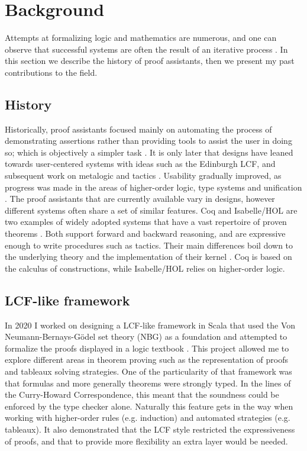 \section{Background}
\label{sec:background}

Attempts at formalizing logic and mathematics are numerous, and one can observe that successful systems are often the result of an iterative process \cite{Paulson2019, Harrison2014}. In this section we describe the history of proof assistants, then we present my past contributions to the field.

\subsection{History}

Historically, proof assistants focused mainly on automating the process of demonstrating assertions rather than providing tools to assist the user in doing so; which is objectively a simpler task \cite{Harrison2014}. It is only later that designs have leaned towards user-centered systems with ideas such as the Edinburgh LCF, and subsequent work on metalogic and tactics \cite{Milner1984}. Usability gradually improved, as progress was made in the areas of higher-order logic, type systems and unification \cite{Paulson2019}. The proof assistants that are currently available vary in designs, however different systems often share a set of similar features. Coq and Isabelle/HOL are two examples of widely adopted systems that have a vast repertoire of proven theorems \cite{Yushkovskiy2018}. Both support forward and backward reasoning, and are expressive enough to write procedures such as tactics. Their main differences boil down to the underlying theory and the implementation of their kernel \cite{Barras1999, Wenzel2021}. Coq is based on the calculus of constructions, while Isabelle/HOL relies on higher-order logic.

\subsection{LCF-like framework}

In 2020 I worked on designing a LCF-like framework in Scala that used the Von Neumann-Bernays-Gödel set theory (NBG) as a foundation \cite{Cassayre2020} and attempted to formalize the proofs displayed in a logic textbook \cite{Mendelson2015}. This project allowed me to explore different areas in theorem proving such as the representation of proofs and tableaux solving strategies. One of the particularity of that framework was that formulas and more generally theorems were strongly typed. In the lines of the Curry-Howard Correspondence, this meant that the soundness could be enforced by the type checker alone. Naturally this feature gets in the way when working with higher-order rules (e.g. induction) and automated strategies (e.g. tableaux). It also demonstrated that the LCF style restricted the expressiveness of proofs, and that to provide more flexibility an extra layer would be needed.

